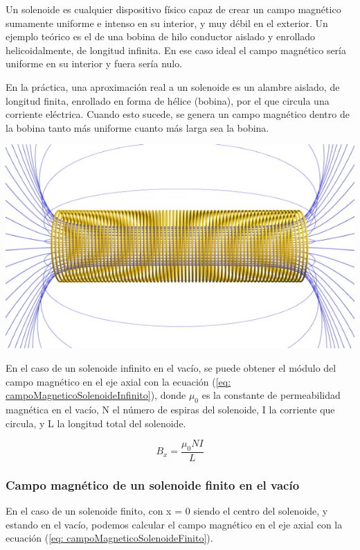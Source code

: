 \documentclass[a4paper,12pt]{article}
\newenvironment{Figure}
    {\par\medskip\noindent\minipage{\linewidth}}
    {\endminipage\par\medskip}
\begin{document}
        Un solenoide es cualquier dispositivo físico capaz de crear un campo magnético sumamente uniforme e intenso en su interior, y muy débil en el exterior. Un ejemplo teórico es el de una bobina de hilo conductor aislado y enrollado helicoidalmente, de longitud infinita. En ese caso ideal el campo magnético sería uniforme en su interior y fuera sería nulo.

        En la práctica, una aproximación real a un solenoide es un alambre aislado, de longitud finita, enrollado en forma de hélice (bobina), por el que circula una corriente eléctrica. Cuando esto sucede, se genera un campo magnético dentro de la bobina tanto más uniforme cuanto más larga sea la bobina.

        \begin{Figure}
            \centering

            \includegraphics[width=0.5\linewidth]{Solenoide.jpg}
            \label{fig: solenoide}
        \end{Figure}

        En el caso de un solenoide infinito en el vacío, se puede obtener el módulo del campo magnético en el eje axial con la ecuación (\ref{eq: campoMagneticoSolenoideInfinito}), donde $\mu_0$ es la constante de permeabilidad magnética en el vacío, N el número de espiras del solenoide, I la corriente que circula, y L la longitud total del solenoide.

        \begin{equation}
            \label{eq: campoMagneticoSolenoideInfinito}
            B_x = \frac{\mu_0 N I}{L}
        \end{equation}

    \subsubsection*{Campo magnético de un solenoide finito en el vacío}
    
        En el caso de un solenoide finito, con x = 0 siendo el centro del solenoide, y estando en el vacío, podemos calcular el campo magnético en el eje axial con la ecuación (\ref{eq: campoMagneticoSolenoideFinito}).
\end{document}
